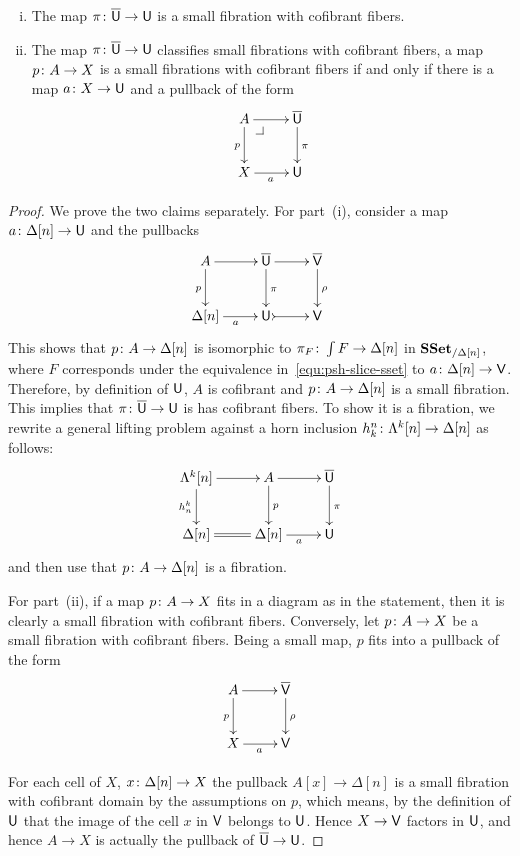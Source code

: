 \documentclass[reqno,10pt,a4paper,oneside,draft]{amsart}
\begin{document}
\begin{proposition} \label{thm:universe-u}  \hfill 
\begin{enumerate}[(i)] 
\item The map $\pi \colon \overline{\mathsf{U}} \to \mathsf{U}$ is a small fibration with cofibrant fibers.
\item The map $\pi \colon \overline{\mathsf{U}} \to \mathsf{U}$ classifies small fibrations with cofibrant fibers, \ie 
a map $p \colon A \to X$ is a small fibrations with cofibrant fibers if and only if 
there is a map $a \colon X \to \mathsf{U}$ and a pullback  of the form
\[
\xymatrix{
A \ar[r] \ar[d]_p \drpullback & \UU \ar[d]^\pi \\
X \ar[r]_{a} & \U }
\]
\end{enumerate}
\end{proposition}

\begin{proof} We prove the two claims separately.
For part~(i), consider a map $a \colon \Delta[n] \rightarrow \mathsf{U}$ and the pullbacks
\[
\xymatrix{
A \ar[r] \ar[d]_p  & \UU \ar[d]^{\pi} \ar[r]  & \VV \ar[d]^{\rho} \\
\Delta[n] \ar[r]_{a} & \U \ar@{>->}[r] & \V }
\]
This shows that $p \colon A \rightarrow \Delta[n]$ is isomorphic to $\pi_F \colon \int F \rightarrow \Delta[n]$ in $\mathbf{SSet}_{/ \Delta[n]}$, where $F$ corresponds under the equivalence in~\eqref{equ:psh-slice-sset} to 
$a \colon \Delta[n] \rightarrow \mathsf{V}$. Therefore, by definition of $\mathsf{U}$, $A$ is cofibrant and $p \colon A \rightarrow \Delta[n]$ is a small fibration. This implies that $\pi \colon \overline{\mathsf{U}} \rightarrow \mathsf{U}$ is has cofibrant fibers. To show it is a fibration, we rewrite a general lifting problem against a horn inclusion $h^n_k \colon \Lambda^k[n] \rightarrow \Delta[n]$ as follows:
\[
\xymatrix{
\Lambda^k[n] \ar[r] \ar[d]_{h^k_n} & A  \ar[d]^{p} \ar[r] & \UU \ar[d]^\pi \\
\Delta[n] \ar@{=}[r]  & \Delta[n] \ar[r]_a & \U  }
\]
and then use that $p \colon A  \to \Delta[n]$ is a fibration.

For part~(ii), if a map $p \colon A \to X$ fits in a diagram as in the statement, then it is clearly a small fibration with
cofibrant fibers. Conversely, let $p \colon A \to X$ be a small fibration with cofibrant fibers. Being a small 
map, $p$ fits into a pullback of the form 
\[
\xymatrix{
A \ar[r] \ar[d]_p  &  \VV \ar[d]^{\rho} \\
X \ar[r]_{a} & \V }
\]

For each cell of $X$,  $x \colon \Delta[n] \rightarrow X$ the pullback $A[x] \rightarrow \Delta[n]$ is a small fibration with cofibrant domain by the assumptions on $p$, which means, by the definition of $\mathsf{U}$ that the image of the cell $x$ in $\mathsf{V}$ belongs to $\mathsf{U}$. Hence $X \rightarrow \mathsf{V}$ factors in $\mathsf{U}$, and hence $A \rightarrow X$ is actually the pullback of $\overline{\mathsf{U}} \rightarrow \mathsf{U}$. \qedhere
\end{proof} 
\end{document}
